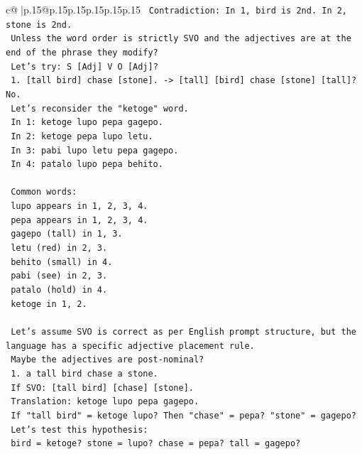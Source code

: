 \documentclass{article}
\begin{document}
{\begin{supertabular}{c@{$\;$}|p{.15\linewidth}@{}p{.15\linewidth}p{.15\linewidth}p{.15\linewidth}p{.15\linewidth}p{.15\linewidth}}
{{{\texttt{   Contradiction: In 1, bird is 2nd. In 2, stone is 2nd.} \\
\texttt{   Unless the word order is strictly SVO and the adjectives are at the end of the phrase they modify?} \\
\texttt{   Let's try: S {[}Adj{]} V O {[}Adj{]}?} \\
\texttt{   1. {[}tall bird{]} chase {[}stone{]}. {-}> {[}tall{]} {[}bird{]} chase {[}stone{]} {[}tall{]}? No.} \\
\texttt{   Let's reconsider the "ketoge" word.} \\
\texttt{   In 1: ketoge lupo pepa gagepo.} \\
\texttt{   In 2: ketoge pepa lupo letu.} \\
\texttt{   In 3: pabi lupo letu pepa gagepo.} \\
\texttt{   In 4: patalo lupo pepa behito.} \\
\\ 
\texttt{   Common words:} \\
\texttt{   lupo appears in 1, 2, 3, 4.} \\
\texttt{   pepa appears in 1, 2, 3, 4.} \\
\texttt{   gagepo (tall) in 1, 3.} \\
\texttt{   letu (red) in 2, 3.} \\
\texttt{   behito (small) in 4.} \\
\texttt{   pabi (see) in 2, 3.} \\
\texttt{   patalo (hold) in 4.} \\
\texttt{   ketoge in 1, 2.} \\
\\ 
\texttt{   Let's assume SVO is correct as per English prompt structure, but the language has a specific adjective placement rule.} \\
\texttt{   Maybe the adjectives are post{-}nominal?} \\
\texttt{   1. a tall bird chase a stone.} \\
\texttt{      If SVO: {[}tall bird{]} {[}chase{]} {[}stone{]}.} \\
\texttt{      Translation: ketoge lupo pepa gagepo.} \\
\texttt{      If "tall bird" = ketoge lupo? Then "chase" = pepa? "stone" = gagepo?} \\
\texttt{      Let's test this hypothesis:} \\
\texttt{      bird = ketoge? stone = lupo? chase = pepa? tall = gagepo?} \\
}}}
\end{supertabular}}
\end{document}
